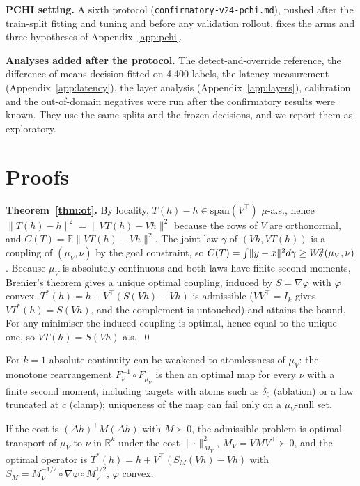 \textbf{PCHI setting.} A sixth protocol (\texttt{confirmatory-v24-pchi.md}),
pushed after the train-split fitting and tuning and before any validation
rollout, fixes the arms and three hypotheses of Appendix~\ref{app:pchi}.

\textbf{Analyses added after the protocol.} The detect-and-override reference,
the difference-of-means decision fitted on 4{,}400 labels, the latency
measurement (Appendix~\ref{app:latency}), the layer analysis
(Appendix~\ref{app:layers}), calibration and the out-of-domain negatives were run
after the confirmatory results were known. They use the same splits and the
frozen decisions, and we report them as exploratory.

\section{Proofs}
\label{app:proofs}

\textbf{Theorem~\ref{thm:ot}.} By locality, $T(h)-h\in\mathrm{span}(V^\top)$
$\mu$-a.s., hence $\lVert T(h)-h\rVert^2=\lVert VT(h)-Vh\rVert^2$ because the
rows of $V$ are orthonormal, and $C(T)=\mathbb{E}\lVert VT(h)-Vh\rVert^2$. The
joint law $\gamma$ of $(Vh,VT(h))$ is a coupling of $(\mu_V,\nu)$ by the goal
constraint, so $C(T)=\int\lVert y-x\rVert^2d\gamma\ge W_2^2(\mu_V,\nu)$.
Because $\mu_V$ is absolutely continuous and both laws have finite second
moments, Brenier's theorem gives a unique optimal coupling, induced by
$S=\nabla\varphi$ with $\varphi$ convex. $T^*(h)=h+V^\top(S(Vh)-Vh)$ is
admissible ($VV^\top=I_k$ gives $VT^*(h)=S(Vh)$, and the complement is
untouched) and attains the bound. For any minimiser the induced coupling is
optimal, hence equal to the unique one, so $VT(h)=S(Vh)$ a.s.\ \qed

For $k=1$ absolute continuity can be weakened to atomlessness of $\mu_V$: the
monotone rearrangement $F_\nu^{-1}\circ F_{\mu_V}$ is then an optimal map for
every $\nu$ with a finite second moment, including targets with atoms such as
$\delta_0$ (ablation) or a law truncated at $c$ (clamp); uniqueness of the map
can fail only on a $\mu_V$-null set.

\begin{proposition}
\label{prop:metric}
If the cost is $(\Delta h)^\top M(\Delta h)$ with $M\succ0$, the admissible
problem is optimal transport of $\mu_V$ to $\nu$ in $\mathbb{R}^k$ under the
cost $\lVert\cdot\rVert^2_{M_V}$, $M_V=VMV^\top\succ0$, and the optimal
operator is $T^*(h)=h+V^\top(S_M(Vh)-Vh)$ with
$S_M=M_V^{-1/2}\circ\nabla\varphi\circ M_V^{1/2}$, $\varphi$ convex.
\end{proposition}

